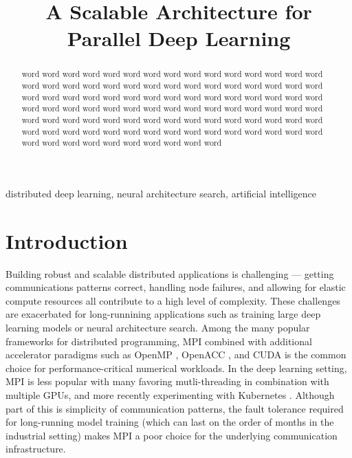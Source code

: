 \documentclass[conference]{IEEEtran}
\begin{document}
\title{A Scalable Architecture for Parallel Deep Learning}

\author{
\and
{}
}

\maketitle

\begin{abstract}
  word word word word word word word word word word
  word word word word word word word word word word
  word word word word word word word word word word
  word word word word word word word word word word
  word word word word word word word word word word
  word word word word word word word word word word
  word word word word word word word word word word
  word word word word word word word word word word
  word word word word word word word word word word
  word word word word word word word word word word
\end{abstract}

\begin{IEEEkeywords}
distributed deep learning, neural architecture search, artificial intelligence
\end{IEEEkeywords}

\section{Introduction}
Building robust and scalable distributed applications is challenging --- getting
communications patterns correct, handling node failures, and allowing for elastic
compute resources all contribute to a high level of complexity. These challenges
are exacerbated for long-runnining applications such as training large deep learning
models or neural architecture search. Among the many popular frameworks for
distributed programming, MPI \cite{Forum:1994:MMI:898758} combined with
additional accelerator paradigms such as OpenMP \cite{Dagum:1998:OIA:615255.615542},
OpenACC \cite{Wienke:2012:OFE:2402420.2402522}, and CUDA \cite{Nickolls:2008:SPP:1365490.1365500}
is the common choice for performance-critical numerical workloads. In the deep
learning setting, MPI is less popular with many favoring mutli-threading in
combination with multiple GPUs, and more recently experimenting with Kubernetes
\cite{8094194, 8672301}. Although part of this is simplicity of communication patterns,
the fault tolerance required for long-running model training (which can last on the
order of months in the industrial setting) makes MPI a poor choice for the underlying
communication infrastructure.
\end{document}
